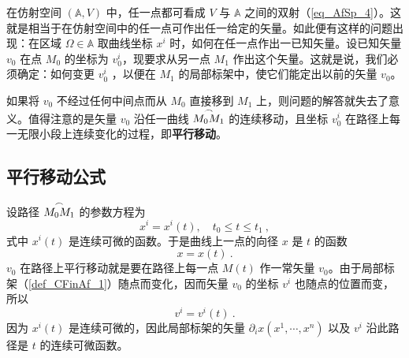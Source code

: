 


在仿射空间 $(\mathbb A,V)$ 中，任一点都可看成 $V$ 与 $\mathbb A$ 之间的双射（\autoref{eq_AfSp_4}）。这就是相当于在仿射空间中的任一点可作出任一给定的矢量。如此便有这样的问题出现：在区域 $\Omega\in\mathbb A$ 取曲线坐标 $x^i$ 时，如何在任一点作出一已知矢量。设已知矢量 $v_0$ 在点 $M_0$ 的坐标为 $v_0^i$，现要求从另一点 $M_1$ 作出这个矢量。这就是说，我们必须确定：如何变更 $v_0^i$ ，以便在 $M_1$ 的局部标架中，使它们能定出以前的矢量 $v_0$。

如果将 $v_0$ 不经过任何中间点而从 $M_0$ 直接移到 $M_1$ 上，则问题的解答就失去了意义。值得注意的是矢量 $v_0$ 沿任一曲线 $\overset{\Huge\frown}{M_0M_1}$ 的连续移动，且坐标 $v_0^i$ 在路径上每一无限小段上连续变化的过程，即\textbf{平行移动}。
\subsection{平行移动公式}
设路径 $\overset{\Huge\frown}{M_0M_1}$ 的参数方程为
\begin{equation}
x^i=x^i(t),\quad t_0\leq t\leq t_1~,
\end{equation}
式中 $x^i(t)$ 是连续可微的函数。于是曲线上一点的向径 $x$ 是 $t$ 的函数
\begin{equation}
x=x(t)~.
\end{equation}
$v_0$ 在路径上平行移动就是要在路径上每一点 $M(t)$ 作一常矢量 $v_0$。由于局部标架（\autoref{def_CFinAf_1}）随点而变化，因而矢量 $v_0$ 的坐标 $v^i$ 也随点的位置而变，所以
\begin{equation}
v^i=v^i(t)~.
\end{equation}
因为 $x^i(t)$ 是连续可微的，因此局部标架的矢量 $\partial_i x(x^1,\cdots,x^n)$ 以及 $v^i$ 沿此路径是 $t$ 的连续可微函数。

